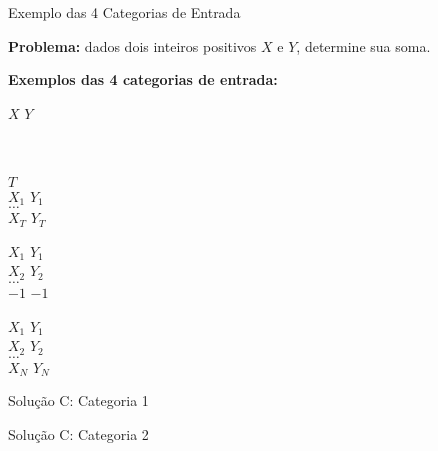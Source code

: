 \begin{frame}[fragile]{Exemplo das 4 Categorias de Entrada}

    \textbf{Problema:} dados dois inteiros positivos $X$ e $Y$, determine sua soma.

    \textbf{Exemplos das 4 categorias de entrada:}

    \begin{minipage}[t]{0.45\textwidth}
    \begin{block}{1}
    $X$ $Y$ \\ \\ \\
    \end{block}
    \end{minipage}
    \begin{minipage}[t]{0.45\textwidth}
    \begin{block}{2}
    $T$ \\
    $X_1$ $Y_1$ \\
    $\ldots$ \\
    $X_T$ $Y_T$
    \end{block}
    \end{minipage}

    \begin{minipage}[t]{0.45\textwidth}
    \begin{block}{3}
    $X_1$ $Y_1$ \\
    $X_2$ $Y_2$ \\
    $\ldots$ \\
    $-1$ $-1$ 
    \end{block}
    \end{minipage}
    \begin{minipage}[t]{0.45\textwidth}
    \begin{block}{4}
    $X_1$ $Y_1$ \\
    $X_2$ $Y_2$ \\
    $\ldots$ \\
    $X_N$ $Y_N$
    \end{block}
    \end{minipage}

\end{frame}

\begin{frame}[fragile]{Solução C: Categoria 1}
\end{frame}

\begin{frame}[fragile]{Solução C: Categoria 2}
\end{frame}

